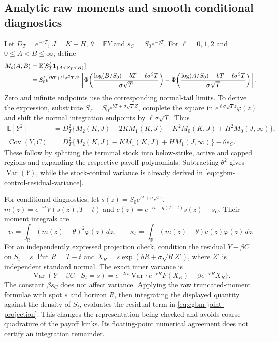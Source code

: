 \documentclass[11pt]{article}
\begin{document}
\subsection{Analytic raw moments and smooth conditional diagnostics}
\label{app:cgbm-moment-evaluation}

Let $D_T=e^{-rT}$, $J=K+H$, $\theta=\mathbb E Y$ and
$s_C=S_0e^{-qT}$. For $\ell=0,1,2$ and $0\leq A<B\leq\infty$, define
\begin{align}
 M_\ell(A,B)&=\mathbb E[S_T^\ell\mathbf1_{\{A<S_T<B\}}]\notag\\
 &=S_0^\ell e^{\ell bT+\ell^2\sigma^2T/2}
 \left[\Phi\!\left(\frac{\log(B/S_0)-bT-\ell\sigma^2T}{\sigma\sqrt T}\right)
 -\Phi\!\left(\frac{\log(A/S_0)-bT-\ell\sigma^2T}{\sigma\sqrt T}\right)\right].
 \label{eq:cgbm-truncated-moments}
\end{align}
Zero and infinite endpoints use the corresponding normal-tail limits.
To derive the expression, substitute $S_T=S_0e^{bT+\sigma\sqrt T Z}$,
complete the square in $e^{\ell\sigma\sqrt T z}\varphi(z)$ and shift
the normal integration endpoints by $\ell\sigma\sqrt T$. Thus
\begin{align}
 \mathbb E[Y^2]&=D_T^2\{M_2(K,J)-2KM_1(K,J)+K^2M_0(K,J)
 +H^2M_0(J,\infty)\},\label{eq:cgbm-raw-second}\\
 \operatorname{Cov}(Y,C)&=D_T^2\{M_2(K,J)-KM_1(K,J)
 +HM_1(J,\infty)\}-\theta s_C.
 \label{eq:cgbm-raw-stock-covariance}
\end{align}
These follow by splitting the terminal stock into below-strike, active
and capped regions and expanding the respective payoff polynomials.
Subtracting $\theta^2$ gives $\operatorname{Var}(Y)$, while the stock-control
variance is already derived in \eqref{eq:cgbm-control-residual-variance}.

For conditional diagnostics, let $s(z)=S_0e^{bt+\sigma\sqrt t z}$,
$m(z)=e^{-rt}V(s(z),T-t)$ and
$c(z)=e^{-rt-q(T-t)}s(z)-s_C$. Their moment integrals are
\begin{equation}
 v_t=\int_{\mathbb R}(m(z)-\theta)^2\varphi(z)\,dz,
 \qquad \kappa_t=\int_{\mathbb R}(m(z)-\theta)c(z)\varphi(z)\,dz.
 \label{eq:cgbm-conditional-moment-integrals}
\end{equation}
For an independently expressed projection check, condition the residual
$Y-\beta C$ on $S_t=s$. Put $R=T-t$ and
$X_R=s\exp(bR+\sigma\sqrt R Z')$, where $Z'$ is independent standard normal.
The exact inner variance is
\begin{equation}
 \operatorname{Var}(Y-\beta C\mid S_t=s)
 =e^{-2rt}\operatorname{Var}\{e^{-rR}F(X_R)-\beta e^{-rR}X_R\}.
 \label{eq:cgbm-inner-residual-variance}
\end{equation}
The constant $\beta s_C$ does not affect variance. Applying the raw
truncated-moment formulae with spot $s$ and horizon $R$, then integrating
the displayed quantity against the density of $S_t$, evaluates the residual
term in \eqref{eq:cgbm-joint-projection}. This changes the representation
being checked and avoids coarse quadrature of the payoff kinks. Its
floating-point numerical agreement does not certify an integration remainder.
\end{document}

